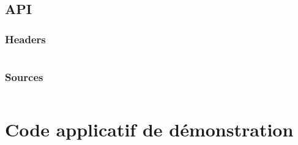 \documentclass[a4paper, 11pt, svgnames]{report}
\begin{document}
\begin{appendices}
        \section{API}
        \subsection{Headers}
        \label{ann:api_h}
        \inputminted[breaklines]{C}{../quartus/ip/BCH/inc/BCHAPI.h}
        \subsection{Sources}
        \inputminted[breaklines]{C}{../quartus/ip/BCH/src/BCHAPI.c}

        \chapter{Code applicatif de démonstration}
        \label{ann:demo}
        \inputminted[breaklines]{C}{../quartus/software/BCH/main.c}


    \end{appendices}
\end{document}
